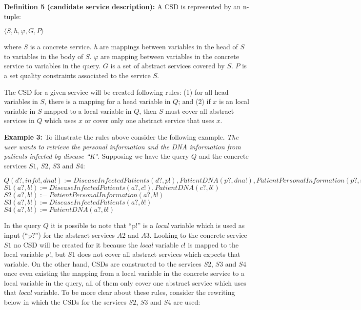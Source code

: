 \documentclass[12pt,a4paper,oneside]{article}
\begin{document}
\noindent \textbf{Definition 5 (candidate service description):} A CSD is represented by an n-tuple: %
\begin{center}
$\langle S, h, \varphi, G, P\rangle$
\end{center}
where $S$ is a concrete service. 
\textit{h} are mappings between variables in the head of $S$ to variables in the body of $S$. 
$\varphi$ are mapping between variables in the concrete service to variables in the query.
$G$ is a set of abstract services covered by $S$. 
$P$ is a set quality constraints associated to the service $S$. 

The CSD for a given service will be created following rules: (1) for all head variables in $S$, there is a mapping for a head variable in $Q$; and (2) if $x$ is an local variable in $S$ mapped to a local variable in $Q$, then $S$ must cover all abstract services in $Q$ which uses $x$ or cover only one abstract service that uses $x$.

\noindent \textbf{Example 3:} To illustrate the rules above consider the following example. 
\textit{The user wants to retrieve the personal information and the DNA information from patients infected by disease ``K"}.
Supposing we have the query $Q$ and the concrete services $S1$, $S2$, $S3$ and $S4$:

\begin{center}
$Q (d?, info!, dna!) := DiseaseInfectedPatients(d?, p!), PatientDNA(p?, dna!), PatientPersonalInformation(p?, info!)$ \\
$S1 (a?, b!) := DiseaseInfectedPatients(a?, c!), PatientDNA(c?, b!)$ \\
$S2 (a?, b!) := PatientPersonalInformation(a?, b!)$ \\
$S3 (a?, b!) := DiseaseInfectedPatients(a?, b!)$ \\
$S4 (a?, b!) := PatientDNA(a?, b!)$ \\
\end{center} 

In the query $Q$ it is possible to note that ``p!'' is a \textit{local} variable which is used as input (``p?'') for the abstract services $A2$ and $A3$. 
Looking to the concrete service $S1$ no CSD will be created for it because the \textit{local} variable $c!$ is mapped to the local variable $p!$, but $S1$ does not cover all abstract services which expects that variable. 
On the other hand, CSDs are constructed to the services $S2$, $S3$ and $S4$ once even existing the mapping from a local variable in the concrete service to a local variable in the query, all of them only cover one abstract service which uses that \textit{local} variable.
To be more clear about these rules, consider the rewriting below in which the CSDs for the services  $S2$, $S3$ and $S4$ are used:
\end{document}
